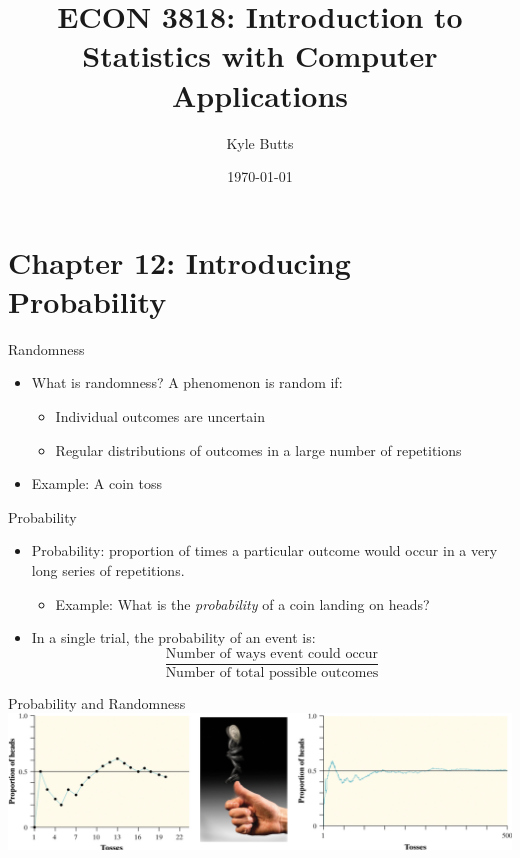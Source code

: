 \documentclass{beamer}
\title{ECON 3818: Introduction to Statistics with Computer Applications}
\date{\today}
\author{Kyle Butts}
\begin{document}
\maketitle




\section{Chapter 12: Introducing Probability}
\begin{frame}{Randomness}
	
	\begin{itemize}
		\item What is randomness? A phenomenon is \alert{random} if:
		      \begin{itemize}
		      	\item Individual outcomes are uncertain
		      	\item Regular distributions of outcomes in a large number of repetitions
		      \end{itemize}
		\item Example: A coin toss
	\end{itemize}
	
\end{frame}

\begin{frame}{Probability}
	
	\begin{itemize}
		\item \alert{Probability}: proportion of times a particular outcome would occur in a very long series of repetitions. 
		      \begin{itemize}
		      	\item Example: What is the \textit{probability} of a coin landing on heads?
		      \end{itemize}
		\item In a single trial, the probability of an event is:
		      \vspace{.2cm}
		      $$\frac{\text{Number of ways event could occur}}{\text{Number of total possible outcomes}}$$
	\end{itemize}
	
\end{frame}

\begin{frame}{Probability and Randomness}
	\includegraphics[width=\textwidth]{cointoss}
\end{frame}
\end{document}
